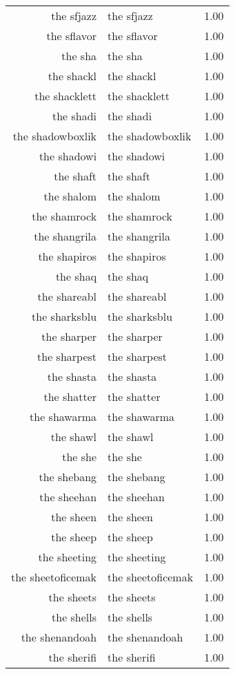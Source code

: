 \begin{table}[ht]
\begin{tabular}{rlr}
  the sfjazz & the sfjazz & 1.00 \\ 
  the sflavor & the sflavor & 1.00 \\ 
  the sha & the sha & 1.00 \\ 
  the shackl & the shackl & 1.00 \\ 
  the shacklett & the shacklett & 1.00 \\ 
  the shadi & the shadi & 1.00 \\ 
  the shadowboxlik & the shadowboxlik & 1.00 \\ 
  the shadowi & the shadowi & 1.00 \\ 
  the shaft & the shaft & 1.00 \\ 
  the shalom & the shalom & 1.00 \\ 
  the shamrock & the shamrock & 1.00 \\ 
  the shangrila & the shangrila & 1.00 \\ 
  the shapiros & the shapiros & 1.00 \\ 
  the shaq & the shaq & 1.00 \\ 
  the shareabl & the shareabl & 1.00 \\ 
  the sharksblu & the sharksblu & 1.00 \\ 
  the sharper & the sharper & 1.00 \\ 
  the sharpest & the sharpest & 1.00 \\ 
  the shasta & the shasta & 1.00 \\ 
  the shatter & the shatter & 1.00 \\ 
  the shawarma & the shawarma & 1.00 \\ 
  the shawl & the shawl & 1.00 \\ 
  the she & the she & 1.00 \\ 
  the shebang & the shebang & 1.00 \\ 
  the sheehan & the sheehan & 1.00 \\ 
  the sheen & the sheen & 1.00 \\ 
  the sheep & the sheep & 1.00 \\ 
  the sheeting & the sheeting & 1.00 \\ 
  the sheetoficemak & the sheetoficemak & 1.00 \\ 
  the sheets & the sheets & 1.00 \\ 
  the shells & the shells & 1.00 \\ 
  the shenandoah & the shenandoah & 1.00 \\ 
  the sherifi & the sherifi & 1.00 \\ 

\end{tabular}
\end{table}

